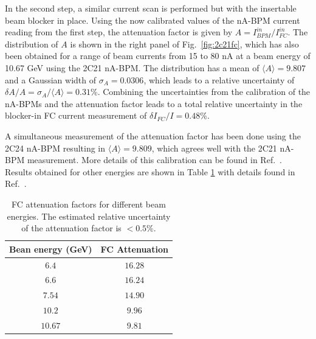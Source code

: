  
In the second step, a similar current scan is performed but with the insertable beam blocker in place. Using the now
calibrated values of the nA-BPM current reading from the first step, the attenuation factor is given by 
$A=I_{BPM}^{in}/{I_{FC}^{in}}$.
The distribution of $A$ is shown in the right panel of Fig.~\ref{fig:2c21fc}, which has also been  obtained for a range of beam 
currents from 15 to 80 nA at a beam energy of 10.67 GeV using the 2C21 nA-BPM.  The distribution has a mean of $\langle A\rangle=9.807$
and a  Gaussian width of $\sigma_A=0.0306$, which leads to a relative uncertainty of $\delta A/A=\sigma_A/\langle A\rangle=0.31$\%. 
Combining the uncertainties from the calibration of the nA-BPMs and the attenuation factor leads to a total relative uncertainty in the 
blocker-in FC current measurement of $\delta I_{FC}/I=0.48$\%. 

A simultaneous measurement of the attenuation factor has been done using the 2C24 nA-BPM resulting in  $\langle A\rangle=9.809$,
which agrees well with the 2C21 nA-BPM measurement. More details of this calibration can be found in Ref.~\cite{note107}. Results obtained 
for other energies are shown in Table \ref{tab:fcatt} with details found in Ref.~\cite{notes}.  

\begin{table}[htb]
 \centering
 \begin{tabular}{|c|c|}
\hline
Bean energy (GeV)& FC Attenuation \\ \hline
$6.4$ &    $16.28$  \\ \hline
$6.6$ &  $16.24$ \\ \hline 
$7.54$  & $14.90$ \\ \hline 
$10.2$  & $9.96$ \\ \hline 
$10.67$   &  $9.81$ \\ \hline 
\end{tabular}
\caption{FC attenuation factors for different beam energies. The estimated relative uncertainty of the attenuation factor is $<0.5$\%.} 
\label{tab:fcatt}
\end{table}


